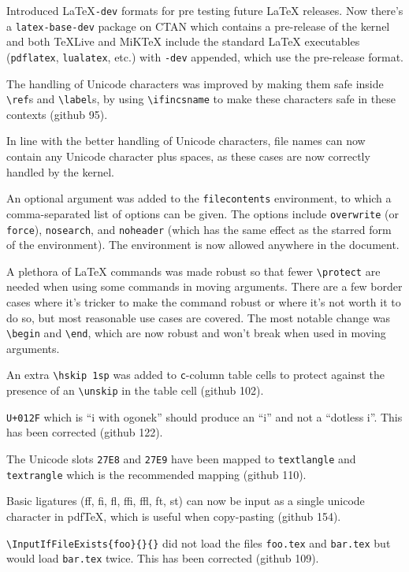 \documentclass{ltxguide}
\newcommand\ghissue[1]{github #1}
\newcommand\ghissue[1]{%
    \href{https://github.com/latex3/latex2e/issues/#1}{github #1}}
\begin{document}
Introduced \LaTeX\texttt{-dev} formats for pre testing future \LaTeX{}
releases. Now there's a \texttt{latex-base-dev} package on CTAN which
contains a pre-release of the \LaTeXe{} kernel and both \TeX Live and
MiK\TeX{} include the standard \LaTeX{} executables (\texttt{pdflatex},
\texttt{lualatex}, etc.) with \texttt{-dev} appended, which use the
pre-release format.

The handling of Unicode characters was improved by making them safe
inside \verb|\ref|s and \verb|\label|s, by using \verb|\ifincsname|
to make these characters safe in these contexts (\ghissue{95}).

In line with the better handling of Unicode characters, file names
can now contain any Unicode character plus spaces, as these cases
are now correctly handled by the kernel.

An optional argument was added to the \texttt{filecontents} environment,
to which a comma-separated list of options can be given. The options
include \texttt{overwrite} (or \texttt{force}), \texttt{nosearch}, and
\texttt{noheader} (which has the same effect as the starred form of the
environment). The environment is now allowed anywhere in the document.

A plethora of \LaTeX{} commands was made robust so that fewer
\verb|\protect| are needed when using some commands in moving arguments.
There are a few border cases where it's tricker to make the command
robust or where it's not worth it to do so, but most reasonable use
cases are covered. The most notable change was \verb|\begin| and
\verb|\end|, which are now robust and won't break when used in moving
arguments.

An extra \verb|\hskip 1sp| was added to \verb|c|-column table cells to
protect against the presence of an \verb|\unskip| in the table cell
(\ghissue{102}).

\texttt{U+012F} which is ``i with ogonek'' should produce an
``i'' and not a ``dotless i''. This has been corrected
(\ghissue{122}).

The Unicode slots \texttt{27E8} and \texttt{27E9} have been mapped to
\verb|textlangle| and \verb|textrangle| which is the recommended mapping
(\ghissue{110}).

Basic ligatures (ff, fi, fl, ffi, ffl, ft, st) can now be input as a
single unicode character in pdf\TeX, which is useful when copy-pasting
(\ghissue{154}).

\verb|\InputIfFileExists{foo}{}{}|
did not load the files \texttt{foo.tex} and \texttt{bar.tex} but
would load \texttt{bar.tex} twice. This has been corrected (\ghissue{109}).
\end{document}
